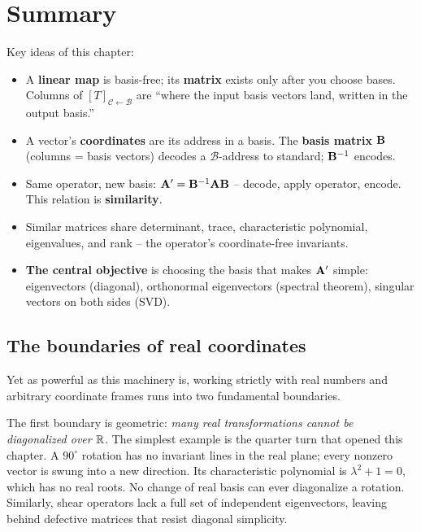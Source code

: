 \section{Summary}
\label{ch31:summary}

\begin{focusbox}
Key ideas of this chapter:
\begin{itemize}
  \item A \textbf{linear map} is basis-free; its \textbf{matrix} exists only after
        you choose bases. Columns of $[T]_{\mathcal{C}\leftarrow\mathcal{B}}$ are
        ``where the input basis vectors land, written in the output basis.''
  \item A vector's \textbf{coordinates} are its address in a basis. The
        \textbf{basis matrix} $\mathbf{B}$ (columns = basis vectors) decodes a
        $\mathcal{B}$-address to standard; $\mathbf{B}^{-1}$ encodes.
  \item Same operator, new basis: $\mathbf{A}'=\mathbf{B}^{-1}\mathbf{A}\mathbf{B}$ -- decode,
        apply operator, encode. This relation is \textbf{similarity}.
  \item Similar matrices share determinant, trace, characteristic polynomial,
        eigenvalues, and rank -- the operator's coordinate-free invariants.
  \item \textbf{The central objective} is choosing the basis that makes $\mathbf{A}'$
        simple: eigenvectors (diagonal), orthonormal eigenvectors (spectral
        theorem), singular vectors on both sides (SVD).
\end{itemize}
\end{focusbox}

\subsection*{The boundaries of real coordinates}

Yet as powerful as this machinery is, working strictly with real numbers and arbitrary coordinate frames runs into two fundamental boundaries.

The first boundary is geometric: \emph{many real transformations cannot be diagonalized over $\mathbb{R}$}. The simplest example is the quarter turn that opened this chapter. A $90^\circ$ rotation has no invariant lines in the real plane; every nonzero vector is swung into a new direction. Its characteristic polynomial is $\lambda^2 + 1 = 0$, which has no real roots. No change of real basis can ever diagonalize a rotation. Similarly, shear operators lack a full set of independent eigenvectors, leaving behind defective matrices that resist diagonal simplicity.

